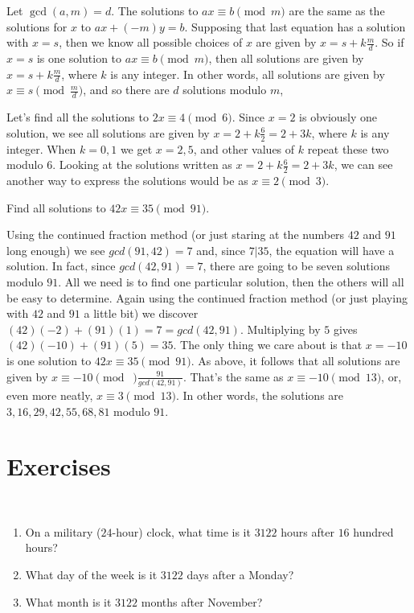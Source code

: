 Let $\gcd(a,m) = d$. The solutions to $ax\equiv b\pmod m$ are the
same as the solutions for $x$ to $ax +(-m)y = b$. Supposing
that last equation has a solution with $x= s$, then we know all
possible choices of $x$ are given by $x = s + k\frac{m}{d}$.
So if $x=s$ is one solution to $ax\equiv b\pmod m$, then all solutions
are given by $x = s +k\frac{m}{d}$, where $k$ is any integer. In other words, all solutions are
given by $x\equiv s \pmod{ \frac{m}{d}}$, and so there are $d$ solutions modulo $m$,

\begin{exmp}
Let's find all the solutions to $2x\equiv 4\pmod 6$.
Since $x=2$ is obviously one solution, we see all solutions are
given by $x = 2+k\frac{6}{2} = 2+3k$, where $k$ is any integer.
When $k=0,1$ we get $x=2,5$, and other values of $k$ repeat these two
modulo $6$.  Looking at the solutions written as
$x = 2+k\frac{6}{2} = 2+3k$, we can see another way to express the solutions
would be as $x\equiv 2 \pmod 3$. 
\end{exmp}

\begin{exmp}
Find all solutions to $42x\equiv 35\pmod{91}$.

Using the continued fraction method (or just staring at the numbers
$42$ and $91$ long enough) we see $gcd(91,42) = 7$ and, since $7 | 35$,
the equation will have a solution. In fact, since $gcd(42,91)=7$, there
are going to be seven solutions modulo $91$. All we need is to find one
particular solution, then the others will all be easy to determine. Again
using the continued fraction method (or just playing with $42$ and $91$
a little bit) we discover $(42)(-2) + (91)(1) = 7 = gcd(42,91)$. Multiplying 
by $5$ gives $(42)(-10) + (91)(5)=35$. The only thing we care about is
that $x=-10$ is one solution to $42x\equiv 35\pmod{91}$.
As above, it follows that all solutions are given by 
$x\equiv -10 \pmod\;{\frac{91}{gcd(42,91)}}$. 
That's the same as $x\equiv -10 \pmod{13}$, or, even more
neatly, $x\equiv 3 \pmod {13}$. 
In other words, the solutions are $3,16,29,42,55,68,81$ modulo $91$.
\end{exmp}

\clearpage

\section{Exercises}

\begin{exer} \ {}
\begin{enumerate}[label=(\alph*)]
 \item On a military ($24$-hour) clock, what time is it $3122$ hours after $16$ hundred hours?
 
 \item What day of the week is it $3122$ days after a Monday?
 
 \item What month is it $3122$ months after November?
\end{enumerate}
\end{exer}

